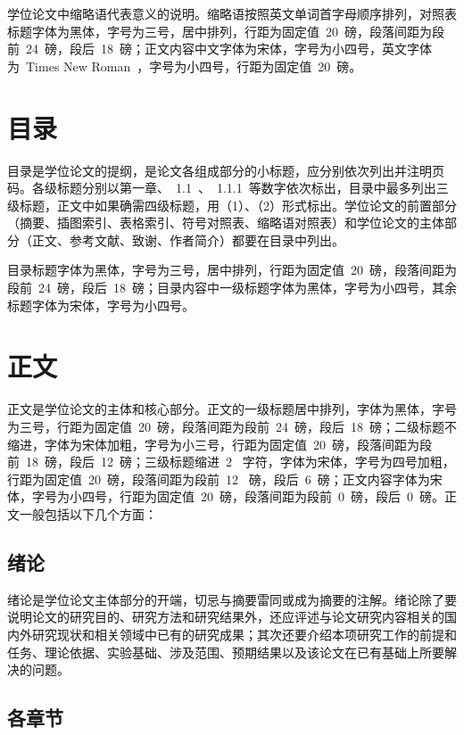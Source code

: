 学位论文中缩略语代表意义的说明。缩略语按照英文单词首字母顺序排列，对照表标题字体为黑体，字号为三号，居中排列，行距为固定值~20~磅，段落间距为段前~24~磅，段后~18~磅；正文内容中文字体为宋体，字号为小四号，英文字体为~Times New Roman~，字号为小四号，行距为固定值~20~磅。

\section{目录}

目录是学位论文的提纲，是论文各组成部分的小标题，应分别依次列出并注明页码。各级标题分别以第一章、~1.1~、~1.1.1~等数字依次标出，目录中最多列出三级标题，正文中如果确需四级标题，用（1）、（2）形式标出。学位论文的前置部分（摘要、插图索引、表格索引、符号对照表、缩略语对照表）和学位论文的主体部分（正文、参考文献、致谢、作者简介）都要在目录中列出。

目录标题字体为黑体，字号为三号，居中排列，行距为固定值~20~磅，段落间距为段前~24~磅，段后~18~磅；目录内容中一级标题字体为黑体，字号为小四号，其余标题字体为宋体，字号为小四号。

\section{正文}

正文是学位论文的主体和核心部分。正文的一级标题居中排列，字体为黑体，字号为三号，行距为固定值~20~磅，段落间距为段前~24~磅，段后~18~磅；二级标题不缩进，字体为宋体加粗，字号为小三号，行距为固定值~20~磅，段落间距为段前~18~磅，段后~12~磅；三级标题缩进~2~ 字符，字体为宋体，字号为四号加粗，行距为固定值~20~磅，段落间距为段前~12~ 磅，段后~6~磅；正文内容字体为宋体，字号为小四号，行距为固定值~20~磅，段落间距为段前~0~磅，段后~0~磅。正文一般包括以下几个方面：

\subsection{绪论}

绪论是学位论文主体部分的开端，切忌与摘要雷同或成为摘要的注解。绪论除了要说明论文的研究目的、研究方法和研究结果外，还应评述与论文研究内容相关的国内外研究现状和相关领域中已有的研究成果；其次还要介绍本项研究工作的前提和任务、理论依据、实验基础、涉及范围、预期结果以及该论文在已有基础上所要解决的问题。

\subsection{各章节}

